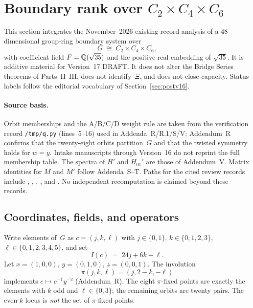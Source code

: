 \section{Boundary rank over $C_2\times C_4\times C_6$}\label{sec:boundaryrank}
This section integrates the November~2026 existing-record analysis of a $48$-dimensional group-ring boundary system over
\[
G\;\cong\; C_2\times C_4\times C_6,
\]
with coefficient field $F=\mathbb{Q}(\sqrt{35})$ and the positive real embedding of $\sqrt{35}$. It is additive material for Version~17 DRAFT. It does not alter the Bridge Series theorems of Parts~II--III, does not identify~$\Xi$, and does not close capacity. Status labels follow the editorial vocabulary of Section~\ref{sec:postv16}.

\paragraph{Source basis.}
Orbit memberships and the A/B/C/D weight rule are taken from the verification record \texttt{/tmp/q.py} (lines~5--16) used in Addenda~R/R.1/S/V; Addendum~R confirms that the twenty-eight orbits partition~$G$ and that the twisted symmetry holds for $w=y$. Intake manuscripts through Version~16 do not reprint the full membership table. The spectra of $H'$ and $H_{01}'$ are those of Addendum~V. Matrix identities for $M$ and $M'$ follow Addenda~S--T. Paths for the cited review records include , , , , and . No independent recomputation is claimed beyond these records.

\subsection{Coordinates, fields, and operators}
\begin{definition}\label{def:v17-coords}
Write elements of~$G$ as $c=(j,k,\ell)$ with $j\in\{0,1\}$, $k\in\{0,1,2,3\}$, $\ell\in\{0,1,2,3,4,5\}$, and set
\[
I(c)\;=\;24j+6k+\ell.
\]
Let $x=(1,0,0)$, $y=(0,1,0)$, $z=(0,0,1)$. The involution
\[
\pi(j,k,\ell)=(j,2-k,-\ell)
\]
implements $c\mapsto c^{-1}y^{-2}$ (Addendum~R). The eight $\pi$-fixed points are exactly the elements with $k$ odd and $\ell\in\{0,3\}$; the remaining orbits are twenty pairs. The even-$k$ locus is \emph{not} the set of $\pi$-fixed points.
\end{definition}

